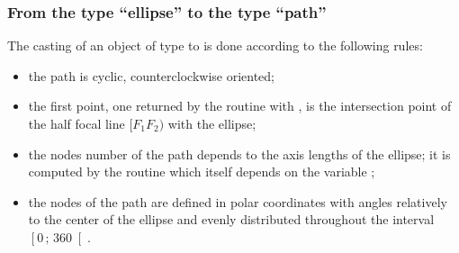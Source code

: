 \documentclass[pdftex]{article}
\begin{document}
\subsubsection{From the type ``ellipse'' to the type ``path''}
The casting of an object of type  to 
is done according to the following rules:
\begin{itemize}
\item the path is cyclic, counterclockwise oriented;
\item the first point, one returned by the routine  with , is the intersection point of the half
  focal line $[F_{1}F_{2})$ with the ellipse;
\item the nodes number of the path depends to the axis lengths of the
  ellipse; it is computed by the routine\linebreak
  which itself depends on the variable
  ;
\item the nodes of the path are defined in polar coordinates with
  angles relatively to the center of the ellipse and evenly
  distributed throughout the interval $\left[0\,;\,360\right[$.
\end{itemize}
\end{document}
